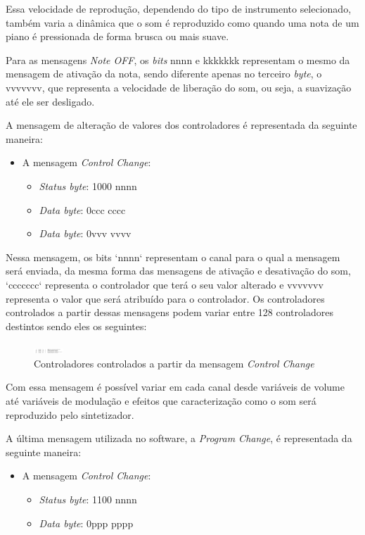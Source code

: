 \documentclass[12pt]{report}
\begin{document}
{Essa velocidade de reprodução, dependendo do tipo de instrumento
selecionado, também varia a dinâmica que o som é reproduzido como
quando uma nota de um piano é pressionada de forma brusca ou mais
suave.

Para as mensagens {\it Note OFF}, os {\it bits} nnnn e kkkkkkk
representam o mesmo da mensagem de ativação da nota, sendo diferente
apenas no terceiro {\it byte}, o vvvvvvv, que representa a velocidade
de liberação do som, ou seja, a suavização até ele ser desligado.

A mensagem de alteração de valores dos controladores é representada da seguinte maneira:
\begin{itemize}
  \item A mensagem {\it Control Change}:
  \begin{itemize}
    \item {\it Status byte}: 1000 nnnn
    \item {\it Data byte}: 0ccc cccc
    \item {\it Data byte}: 0vvv vvvv
  \end{itemize}
\end{itemize}

Nessa mensagem, os bits `nnnn` representam o canal para o qual a
mensagem será enviada, da mesma forma das mensagens de ativação e
desativação do som, `ccccccc` representa o controlador que terá o seu
valor alterado e vvvvvvv representa o valor que será atribuído para o
controlador. Os controladores controlados a partir dessas mensagens
podem variar entre 128 controladores destintos sendo eles os
seguintes:

\begin{figure}[H]
  \centering
    \includegraphics[width=0.1\textwidth]{imagens/controladores.png}
    \caption{Controladores controlados a partir da mensagem {\it Control Change}}
  \label{fig:controladores}
\end{figure}

Com essa mensagem é possível variar em cada canal desde variáveis de
volume até variáveis de modulação e efeitos que caracterização como o
som será reproduzido pelo sintetizador.

A última mensagem utilizada no software, a  {\it Program  Change}, é
representada da seguinte maneira:
\begin{itemize}
  \item A mensagem {\it Control Change}:
  \begin{itemize}
    \item {\it Status byte}: 1100 nnnn
    \item {\it Data byte}: 0ppp pppp
  \end{itemize}
\end{itemize}

}
\end{document}
